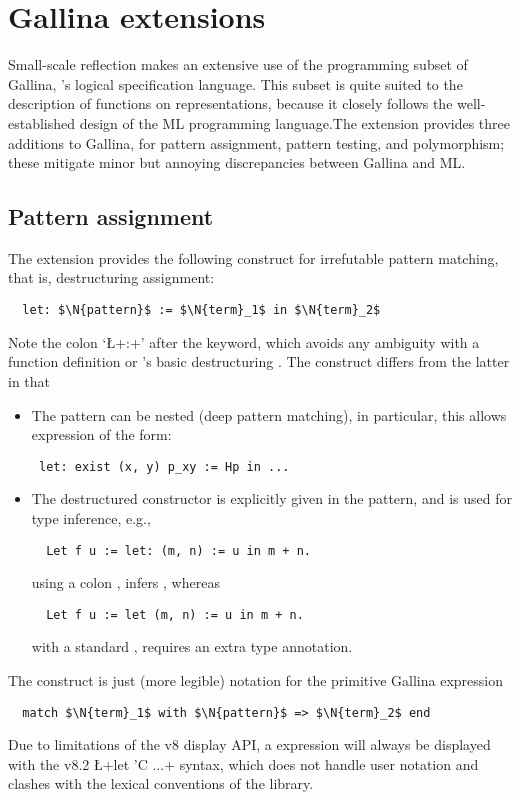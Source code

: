 \section{Gallina extensions}

Small-scale reflection makes an extensive use of the programming
subset of Gallina, \Coq{}'s logical specification language. This subset
is quite suited to the description of functions on representations,
because it closely follows the well-established design of the ML
programming language.The \ssr{} extension provides three additions
to Gallina, for pattern assignment, pattern testing, and polymorphism;
these mitigate minor but annoying discrepancies between Gallina and ML.

\subsection{Pattern assignment}\label{ssec:patass}
The \ssr{} extension provides the following construct for
irrefutable pattern matching, that is, destructuring assignment:
\begin{lstlisting}
  let: $\N{pattern}$ := $\N{term}_1$ in $\N{term}_2$
\end{lstlisting}
Note the colon `\L+:+' after the  keyword, which avoids any
ambiguity with a function
definition or \Coq{}'s basic destructuring . The 
construct differs from the latter in that
\begin{itemize}
\item The pattern can be nested (deep pattern matching), in
  particular, this allows expression of the form:
\begin{lstlisting}
 let: exist (x, y) p_xy := Hp in ...
\end{lstlisting}
\item The destructured constructor is explicitly given in the
  pattern, and is used for type inference, e.g.,
\begin{lstlisting}
  Let f u := let: (m, n) := u in m + n.
\end{lstlisting}
using a colon , infers , whereas
\begin{lstlisting}
  Let f u := let (m, n) := u in m + n.
\end{lstlisting}
with a standard , requires an extra type annotation.
\end{itemize}
The  construct is just (more legible) notation for the primitive Gallina expression
\begin{lstlisting}
  match $\N{term}_1$ with $\N{pattern}$ => $\N{term}_2$ end
\end{lstlisting}
Due to limitations of the \Coq{} v8 display API, a  expression
will always be displayed with the \Coq{} v8.2 \L+let 'C ...+ syntax, which
does not handle user notation and clashes with the lexical conventions of the
\ssr{} library.

